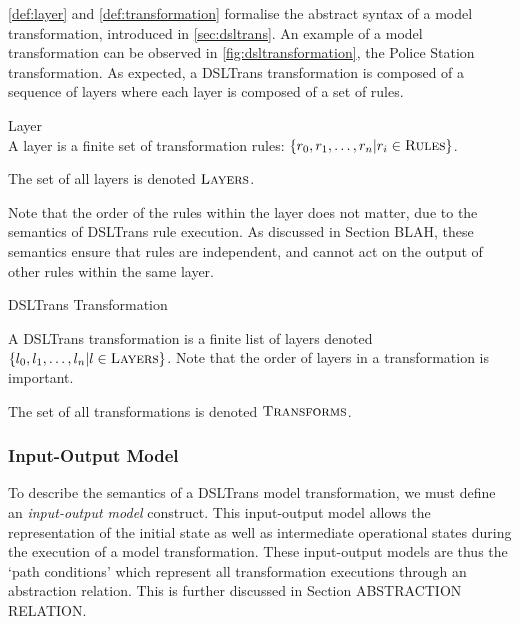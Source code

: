 \cref{def:layer} and \cref{def:transformation} formalise the abstract syntax of a model transformation, introduced in \cref{sec:dsltrans}. An example of a model transformation can be observed in \cref{fig:dsltransformation}, the Police Station transformation. As expected, a DSLTrans transformation is composed of a sequence of layers where each layer is composed of a set of rules.

\begin{definition}{Layer\\}
\label{def:layer}
A layer is a finite set of transformation rules: $\{r_0, r_1, \dots, r_n | r_i \in \textsc{Rules}\}$.

The set of all layers is denoted $\textsc{Layers}$. 
\end{definition}

Note that the order of the rules within the layer does not matter, due to the semantics of DSLTrans rule execution. As discussed in Section BLAH, these semantics ensure that rules are independent, and cannot act on the output of other rules within the same layer.

\begin{definition}{DSLTrans Transformation\\}
\label{def:transformation}

A DSLTrans transformation is a finite list of layers denoted $\{l_0, l_1, \dots, l_n | l \in \textsc{Layers}\}$. Note that the order of layers in a transformation is important.

The set of all transformations is denoted $\textsc{Transforms}$.



\end{definition}



\subsubsection*{Input-Output Model}

To describe the semantics of a DSLTrans model transformation, we must define an \textit{input-output model} construct. This input-output model allows the representation of the initial state as well as intermediate operational states during the execution of a model transformation. These input-output models are thus the `path conditions' which represent all transformation executions through an abstraction relation. This is further discussed in Section ABSTRACTION RELATION.

